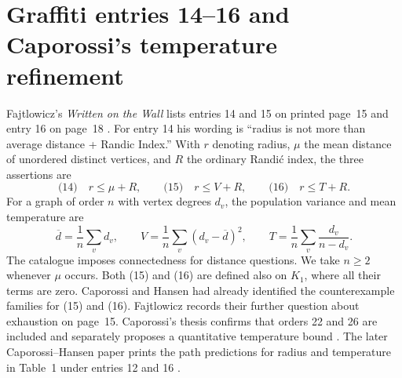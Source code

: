 \documentclass[11pt,a4paper]{article}
\begin{document}
\section{Graffiti entries 14--16 and Caporossi's temperature refinement}
\label{sec:catalogue}
Fajtlowicz's \emph{Written on the Wall} lists entries 14 and 15 on
printed page~15 and entry 16 on page~18 \cite{cat-wow}. For entry 14
his wording is ``radius is not more than average distance + Randic Index.''
With $r$ denoting radius, $\mu$ the mean distance of unordered distinct
vertices, and $R$ the ordinary Randi\'c index, the three assertions are
\[
 \text{(14)}\quad r\le\mu+R,\qquad
 \text{(15)}\quad r\le V+R,\qquad
 \text{(16)}\quad r\le T+R.
\]
For a graph of order $n$ with vertex degrees $d_v$, the population variance
and mean temperature are
\[
 \overline d=\frac1n\sum_v d_v,\qquad
 V=\frac1n\sum_v(d_v-\overline d)^2,\qquad
 T=\frac1n\sum_v\frac{d_v}{n-d_v}.
\]
The catalogue imposes connectedness for distance questions. We take
$n\ge2$ whenever $\mu$ occurs. Both (15) and (16) are defined also on
$K_1$, where all their terms are zero. Caporossi and Hansen had already
identified the counterexample families for (15) and (16). Fajtlowicz
records their further question about exhaustion on page~15. Caporossi's
thesis confirms that orders 22 and 26 are included and separately
proposes a quantitative temperature bound \cite[pp.~34--35]{cat-thesis}.
The later Caporossi--Hansen paper prints the path predictions for radius
and temperature in Table~1 under entries 12 and 16 \cite{cat-agx2004}.
\end{document}
